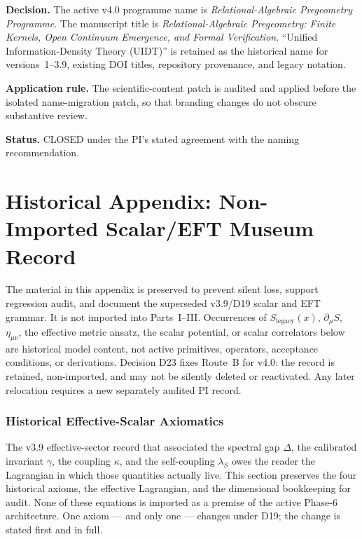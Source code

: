 \documentclass[12pt,a4paper,twoside]{article}
\theoremstyle{plain}
\theoremstyle{definition}
\theoremstyle{remark}
\newcommand{\LegacySx}{S_{\mathrm{legacy}}(x)} %
\begin{document}
\begin{pioverridebox}
\label{box:pi-decision-d25-name}
\textbf{Decision.} The active v4.0 programme name is
\emph{Relational-Algebraic Pregeometry Programme}. The manuscript title is
\emph{Relational-Algebraic Pregeometry: Finite Kernels, Open Continuum
Emergence, and Formal Verification}. ``Unified Information-Density Theory
(UIDT)'' is retained as the historical name for versions~1--3.9, existing DOI
titles, repository provenance, and legacy notation.

\textbf{Application rule.} The scientific-content patch is audited and
applied before the isolated name-migration patch, so that branding changes do
not obscure substantive review.

\textbf{Status.} CLOSED under the PI's stated agreement with the naming
recommendation.
\end{pioverridebox}

\toggletrue{museumwatermark}
\part*{Historical Appendix: Non-Imported Scalar/EFT Museum Record}

\begin{governancebox}
The material in this appendix is preserved to prevent silent loss, support
regression audit, and document the superseded v3.9/D19 scalar and EFT grammar.
It is not imported into Parts~I--III. Occurrences of
$\LegacySx$, $\partial_\mu S$, $\eta_{\mu\nu}$, the effective metric ansatz,
the scalar potential, or scalar correlators below are historical model content,
not active primitives, operators, acceptance conditions, or derivations.
Decision D23 fixes Route~B for v4.0: the record is retained, non-imported, and
may not be silently deleted or reactivated. Any later relocation requires a
new separately audited PI record.
\end{governancebox}

\section{Historical Effective-Scalar Axiomatics}
\label{sec:axiomatics}
\label{app:scalar-museum}

\noindent The v3.9 effective-sector record that associated the spectral gap $\Delta$, the
calibrated invariant $\gamma$, the coupling $\kappa$, and the
self-coupling $\lambda_S$ owes the reader the Lagrangian in which those
quantities actually live. This section preserves the four historical axioms, the effective
Lagrangian, and the dimensional bookkeeping for audit. None of these equations
is imported as a premise of the active Phase-6 architecture.
One axiom --- and only one --- changes under D19; the change is stated
first and in full.
\end{document}
